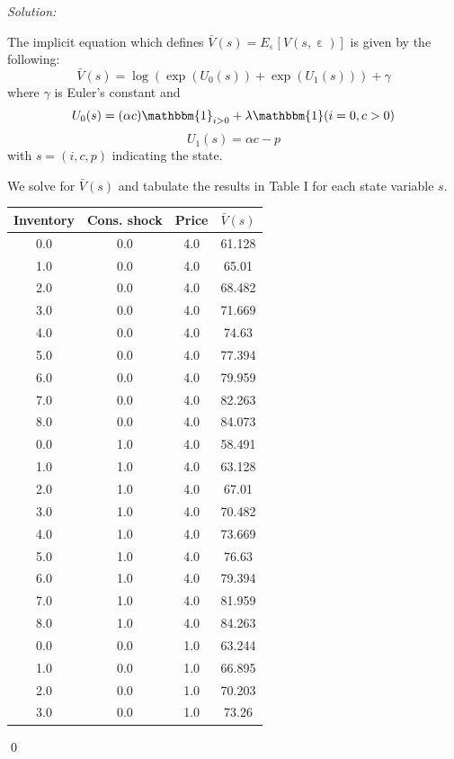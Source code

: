 \documentclass[12pt]{article}
\DeclareMathOperator{\eps}{\varepsilon}
\newenvironment{sol}
    {\emph{Solution:}
    }
    {
    \qed
    }
\begin{document}
\begin{sol}
    The implicit equation which defines $\bar{V}(s) = E_{\eps}[V(s, \eps)]$ is given by the following:
    \[\bar{V}(s) = \log(\exp(U_0(s)) + \exp(U_1(s))) + \gamma \]
    where $\gamma$ is Euler's constant and 
    \[U_0(s) = (\alpha c)\mathbbm{1}_{ i > 0} + \lambda \mathbbm{1}(i = 0, c > 0) \]
    \[U_1(s) = \alpha c - p\]
    with $s = (i, c, p)$ indicating the state.

    We solve for $\bar{V}(s)$ and tabulate the results in Table I for each state variable $s$. 
    \begin{table}
        \centering
        \begin{tabular}{|c|c|c|c|}
            \hline
            Inventory & Cons. shock & Price & $\bar{V}(s)$\\
            \hline 
            0.0 & 0.0 & 4.0 & 61.128 \\
            1.0 & 0.0 & 4.0 & 65.01 \\
            2.0 & 0.0 & 4.0 & 68.482 \\
            3.0 & 0.0 & 4.0 & 71.669 \\
            4.0 & 0.0 & 4.0 & 74.63 \\
            5.0 & 0.0 & 4.0 & 77.394 \\
            6.0 & 0.0 & 4.0 & 79.959 \\
            7.0 & 0.0 & 4.0 & 82.263 \\
            8.0 & 0.0 & 4.0 & 84.073 \\
            0.0 & 1.0 & 4.0 & 58.491 \\
            1.0 & 1.0 & 4.0 & 63.128 \\
            2.0 & 1.0 & 4.0 & 67.01 \\
            3.0 & 1.0 & 4.0 & 70.482 \\
            4.0 & 1.0 & 4.0 & 73.669 \\
            5.0 & 1.0 & 4.0 & 76.63 \\
            6.0 & 1.0 & 4.0 & 79.394 \\
            7.0 & 1.0 & 4.0 & 81.959 \\
            8.0 & 1.0 & 4.0 & 84.263 \\
            0.0 & 0.0 & 1.0 & 63.244 \\
            1.0 & 0.0 & 1.0 & 66.895 \\
            2.0 & 0.0 & 1.0 & 70.203 \\
            3.0 & 0.0 & 1.0 & 73.26 \\

\end{tabular}
\end{table}
\end{sol}
\end{document}
